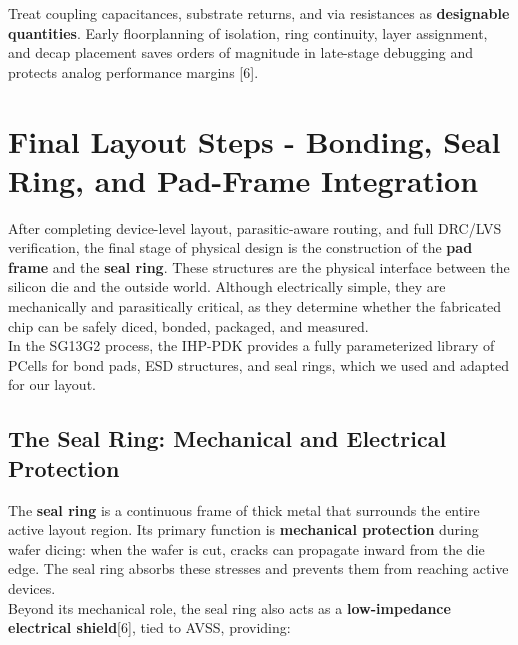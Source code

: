\documentclass[
  11pt,
  a4paper,
  oneside]{scrbook}
\begin{document}
\begin{tcolorbox}[enhanced jigsaw, opacityback=0, breakable, colback=white, left=2mm, toprule=.15mm, arc=.35mm, coltitle=black, leftrule=.75mm, colbacktitle=quarto-callout-tip-color!10!white, rightrule=.15mm, colframe=quarto-callout-tip-color-frame, titlerule=0mm, title=\textcolor{quarto-callout-tip-color}{\faLightbulb}\hspace{0.5em}{Pro Tip - Parasitics Are Design Variables}, toptitle=1mm, bottomtitle=1mm, bottomrule=.15mm, opacitybacktitle=0.6]

Treat coupling capacitances, substrate returns, and via resistances as
\textbf{designable quantities}. Early floorplanning of isolation, ring
continuity, layer assignment, and decap placement saves orders of
magnitude in late-stage debugging and protects analog performance
margins {[}6{]}.

\end{tcolorbox}

\chapter{Final Layout Steps - Bonding, Seal Ring, and Pad-Frame
Integration}\label{final-layout-steps---bonding-seal-ring-and-pad-frame-integration}

After completing device-level layout, parasitic-aware routing, and full
DRC/LVS verification, the final stage of physical design is the
construction of the \textbf{pad frame} and the \textbf{seal ring}. These
structures are the physical interface between the silicon die and the
outside world. Although electrically simple, they are mechanically and
parasitically critical, as they determine whether the fabricated chip
can be safely diced, bonded, packaged, and measured.\\
In the SG13G2 process, the IHP-PDK provides a fully parameterized
library of PCells for bond pads, ESD structures, and seal rings, which
we used and adapted for our layout.

\section{The Seal Ring: Mechanical and Electrical
Protection}\label{the-seal-ring-mechanical-and-electrical-protection}

The \textbf{seal ring} is a continuous frame of thick metal that
surrounds the entire active layout region. Its primary function is
\textbf{mechanical protection} during wafer dicing: when the wafer is
cut, cracks can propagate inward from the die edge. The seal ring
absorbs these stresses and prevents them from reaching active devices.\\
Beyond its mechanical role, the seal ring also acts as a
\textbf{low-impedance electrical shield}{[}6{]}, tied to AVSS,
providing:
\end{document}
